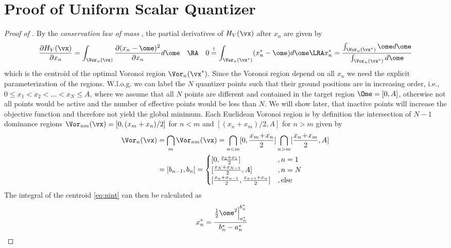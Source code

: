 \section{Proof of Uniform Scalar Quantizer}\label{app:UniformScalarQuantizer}
\begin{proof}[Proof of ]
  By the \emph{conservation law of
  mass} \cite[Thm.2.2]{CMB05}, the partial derivatives of $H_V(\vx)$ after $x_n$ are given by
  \begin{align}
   \frac{\partial H_V(\vx)}{\partial x_n} &= \int_{\Vor_n(\vx)} \frac{ \partial (x_n-\ome)^2}{\partial x_n} d\ome 
    &\RA\quad   0\overset{!}{=}  \int_{\Vor_n(\vx^*)}(x_n^*-\ome) d\ome \LRA x_n^*=\frac{\int_{\Vor_n(\vx^*)}
  \ome d\ome}{\int_{\Vor_n(\vx^*)} d\ome}
    \label{eq:nint}
  \end{align}
  which is the centroid of the optimal Voronoi region $\Vor_n(\vx^*)$. 
  Since the Voronoi region depend on all $x_n$ we need the explicit parameterization of the regions.  W.l.o.g. we can
  label the $N$ quantizer points such that their ground positions are in increasing order, i.e., $0\leq x_1 < x_2 < \dots < x_N\leq
  A$, where we assume that all $N$ points are different and contained in the target region $\Ome=[0,A]$,
  otherwise not all points would be active and the number of effective points would be less than $N$. We will show later,
  that inactive points will increase the objective function and therefore not yield the global minimum. Each Euclidean
  Voronoi region is by definition  the intersection of $N-1$ dominance regions $\Vor_{nm}(\vx)=[0,(x_m+x_n)/2]$ for
  $n<m$ and $[(x_n+x_m)/2,A]$ for $n>m$ given by
   \begin{align}
       \Vor_n(\vx) &= \bigcap_m \Vor_{nm}(\vx)=\bigcap_{n<m} [0,\frac{x_m\!+\!x_n}{2}] \bigcap_{n>m} [\frac{x_n\!+\!x_m}{2},A] \\
       &=[b_{n-1},b_n]
       =\begin{cases} 
       [0,\frac{x_2+x_1}{2}] &, n=1\\
       [\frac{x_{N}+x_{N-1}}{2},A] &, n=N\\
       [\frac{x_{n}+x_{n-1}}{2},\frac{x_{n+1}+x_n}{2}] &,\text{else}
       \end{cases}\label{eq:Vorn}
  \end{align}
  The integral of the centroid \eqref{eq:nint} can then be calculated  as
  \begin{align}
      x_n^* &= \frac{ \frac{1}{2} \ome^2 \Big|_{a_n^*}^{b_n^*}}{ b_n^*-a_n^*}

\end{align}
\end{proof}
